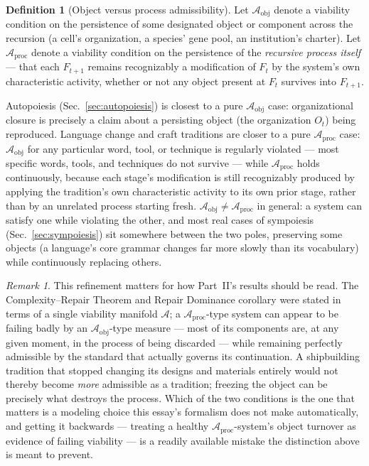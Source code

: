 \documentclass[11pt,a4paper]{article}
\theoremstyle{plain}
\theoremstyle{definition}
\newtheorem{definition}[theorem]{Definition}
\theoremstyle{remark}
\newtheorem{remark}[theorem]{Remark}
\newcommand{\Adm}{\mathcal{A}}
\begin{document}
\begin{definition}[Object versus process admissibility]
\label{def:object-process-admissibility}
Let $\Adm_{\mathrm{obj}}$ denote a viability condition on the persistence of some designated object or component across the recursion (a cell's organization, a species' gene pool, an institution's charter). Let $\Adm_{\mathrm{proc}}$ denote a viability condition on the persistence of the \emph{recursive process itself} — that each $F_{t+1}$ remains recognizably a modification of $F_t$ by the system's own characteristic activity, whether or not any object present at $F_t$ survives into $F_{t+1}$.
\end{definition}

Autopoiesis (Sec.~\ref{sec:autopoiesis}) is closest to a pure $\Adm_{\mathrm{obj}}$ case: organizational closure is precisely a claim about a persisting object (the organization $O_t$) being reproduced. Language change and craft traditions are closer to a pure $\Adm_{\mathrm{proc}}$ case: $\Adm_{\mathrm{obj}}$ for any particular word, tool, or technique is regularly violated — most specific words, tools, and techniques do not survive — while $\Adm_{\mathrm{proc}}$ holds continuously, because each stage's modification is still recognizably produced by applying the tradition's own characteristic activity to its own prior stage, rather than by an unrelated process starting fresh. $\Adm_{\mathrm{obj}} \ne \Adm_{\mathrm{proc}}$ in general: a system can satisfy one while violating the other, and most real cases of sympoiesis (Sec.~\ref{sec:sympoiesis}) sit somewhere between the two poles, preserving some objects (a language's core grammar changes far more slowly than its vocabulary) while continuously replacing others.

\begin{remark}
This refinement matters for how Part~II's results should be read. The Complexity--Repair Theorem and Repair Dominance corollary were stated in terms of a single viability manifold $\Adm$; a $\Adm_{\mathrm{proc}}$-type system can appear to be failing badly by an $\Adm_{\mathrm{obj}}$-type measure — most of its components are, at any given moment, in the process of being discarded — while remaining perfectly admissible by the standard that actually governs its continuation. A shipbuilding tradition that stopped changing its designs and materials entirely would not thereby become \emph{more} admissible as a tradition; freezing the object can be precisely what destroys the process. Which of the two conditions is the one that matters is a modeling choice this essay's formalism does not make automatically, and getting it backwards — treating a healthy $\Adm_{\mathrm{proc}}$-system's object turnover as evidence of failing viability — is a readily available mistake the distinction above is meant to prevent.
\end{remark}
\end{document}
